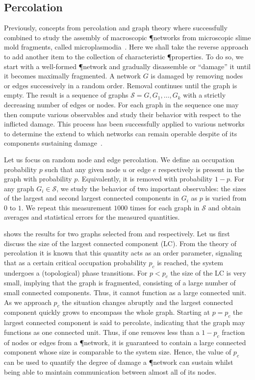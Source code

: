 	\subsection{Percolation}

		Previously, concepts from percolation and graph theory where successfully combined to study the assembly of macroscopic \P networks from microscopic slime mold fragments, called microplasmodia~\cite{fessel2012physarum,fessel2014analytical,fessel2015structuring}. Here we shall take the reverse approach to add another item to the collection of characteristic \P properties. To do so, we start with a well-formed \P network and gradually disassemble or ``damage'' it until it becomes maximally fragmented. A network $G$ is damaged by removing nodes or edges successively in a random order. Removal continues until the graph is empty. The result is a sequence of graphs $\mathcal{S} = {G, G_1, \ldots, G_k}$ with a strictly decreasing number of edges or nodes. For each graph in the sequence one may then compute various observables and study their behavior with respect to the inflicted damage. This process has been successfully applied to various networks to determine the extend to which networks can remain operable despite of its components sustaining damage~\cite{callaway2000network,carlson2002complexity}. 

		Let us focus on random node and edge percolation. We define an occupation probability $p$ such that any given node $u$ or edge $e$ respectively is present in the graph with probability $p$. Equivalently, it is removed with probability $1-p$. For any graph $G_i \in \mathcal{S} $, we study the behavior of two important observables: the sizes of the largest and second largest connected components in $G_i$ as $p$ is varied from $0$ to $1$. We repeat this measurement $1000$ times for each graph in $\mathcal{S}$ and obtain averages and statistical errors for the measured quantities. 

		 shows the results for two graphs selected from  and  respectively. Let us first discuss the size of the largest connected component (LC). From the theory of percolation it is known that this quantity acts as an order parameter, signaling that as a certain critical occupation probability $p_c$ is reached, the system undergoes a (topological) phase transitions. For $p < p_c$ the size of the LC is very small, implying that the graph is fragmented, consisting of a large number of small connected components. Thus, it cannot function as a large connected unit. As we approach $p_c$ the situation changes abruptly and the largest connected component quickly grows to encompass the whole graph. Starting at $p=p_c$ the largest connected component is said to percolate, indicating that the graph may functions as one connected unit. Thus, if one removes less than a $1-p_c$ fraction of nodes or edges from a \P network, it is guaranteed to contain a large connected component whose size is comparable to the system size. Hence, the value of $p_c$ can be used to quantify the degree of damage a \P network can sustain whilst being able to maintain communication between almost all of its nodes.  

